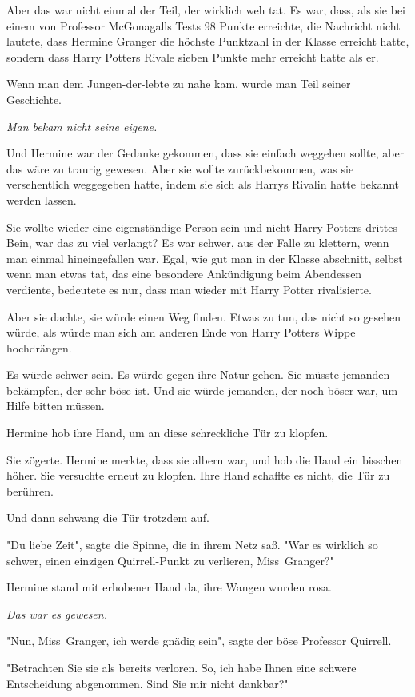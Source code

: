 {Aber das war nicht einmal der Teil, der wirklich weh tat. Es war, dass, als sie bei einem von Professor McGonagalls Tests 98 Punkte erreichte, die Nachricht nicht lautete, dass Hermine Granger die höchste Punktzahl in der Klasse erreicht hatte, sondern dass Harry Potters Rivale sieben Punkte mehr erreicht hatte als er.

Wenn man dem Jungen-der-lebte zu nahe kam, wurde man Teil seiner Geschichte.

\emph{Man bekam nicht seine eigene.}

Und Hermine war der Gedanke gekommen, dass sie einfach weggehen sollte, aber das wäre zu traurig gewesen. Aber sie wollte zurückbekommen, was sie versehentlich weggegeben hatte, indem sie sich als Harrys Rivalin hatte bekannt werden lassen.

Sie wollte wieder eine eigenständige Person sein und nicht Harry Potters drittes Bein, war das zu viel verlangt? Es war schwer, aus der Falle zu klettern, wenn man einmal hineingefallen war. Egal, wie gut man in der Klasse abschnitt, selbst wenn man etwas tat, das eine besondere Ankündigung beim Abendessen verdiente, bedeutete es nur, dass man wieder mit Harry Potter rivalisierte.

Aber sie dachte, sie würde einen Weg finden. Etwas zu tun, das nicht so gesehen würde, als würde man sich am anderen Ende von Harry Potters Wippe hochdrängen.

Es würde schwer sein. Es würde gegen ihre Natur gehen. Sie müsste jemanden bekämpfen, der sehr böse ist. Und sie würde jemanden, der noch böser war, um Hilfe bitten müssen.

Hermine hob ihre Hand, um an diese schreckliche Tür zu klopfen.

Sie zögerte. Hermine merkte, dass sie albern war, und hob die Hand ein bisschen höher. Sie versuchte erneut zu klopfen. Ihre Hand schaffte es nicht, die Tür zu berühren.

Und dann schwang die Tür trotzdem auf.

"Du liebe Zeit", sagte die Spinne, die in ihrem Netz saß. "War es wirklich so schwer, einen einzigen Quirrell-Punkt zu verlieren, Miss~Granger?"

Hermine stand mit erhobener Hand da, ihre Wangen wurden rosa.

\emph{Das war es gewesen.}

"Nun, Miss~Granger, ich werde gnädig sein", sagte der böse Professor Quirrell.

"Betrachten Sie sie als bereits verloren. So, ich habe Ihnen eine schwere Entscheidung abgenommen. Sind Sie mir nicht dankbar?"

}
